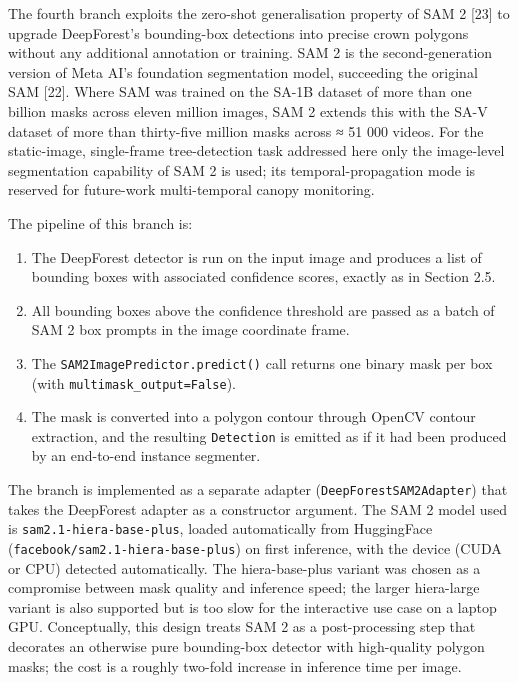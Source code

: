 The fourth branch exploits the zero-shot generalisation property of SAM 2 {[}23{]} to upgrade DeepForest's bounding-box detections into precise crown polygons without any additional annotation or training. SAM 2 is the second-generation version of Meta AI's foundation segmentation model, succeeding the original SAM {[}22{]}. Where SAM was trained on the SA-1B dataset of more than one billion masks across eleven million images, SAM 2 extends this with the SA-V dataset of more than thirty-five million masks across ≈ 51 000 videos. For the static-image, single-frame tree-detection task addressed here only the image-level segmentation capability of SAM 2 is used; its temporal-propagation mode is reserved for future-work multi-temporal canopy monitoring.

The pipeline of this branch is:

\begin{enumerate}
\def\labelenumi{\arabic{enumi}.}
\tightlist
\item
  The DeepForest detector is run on the input image and produces a list of bounding boxes with associated confidence scores, exactly as in Section 2.5.
\item
  All bounding boxes above the confidence threshold are passed as a batch of SAM 2 box prompts in the image coordinate frame.
\item
  The \texttt{SAM2ImagePredictor.predict()} call returns one binary mask per box (with \texttt{multimask\_output=False}).
\item
  The mask is converted into a polygon contour through OpenCV contour extraction, and the resulting \texttt{Detection} is emitted as if it had been produced by an end-to-end instance segmenter.
\end{enumerate}

The branch is implemented as a separate adapter (\texttt{DeepForestSAM2Adapter}) that takes the DeepForest adapter as a constructor argument. The SAM 2 model used is \texttt{sam2.1-hiera-base-plus}, loaded automatically from HuggingFace (\texttt{facebook/sam2.1-hiera-base-plus}) on first inference, with the device (CUDA or CPU) detected automatically. The hiera-base-plus variant was chosen as a compromise between mask quality and inference speed; the larger hiera-large variant is also supported but is too slow for the interactive use case on a laptop GPU. Conceptually, this design treats SAM 2 as a post-processing step that decorates an otherwise pure bounding-box detector with high-quality polygon masks; the cost is a roughly two-fold increase in inference time per image.

